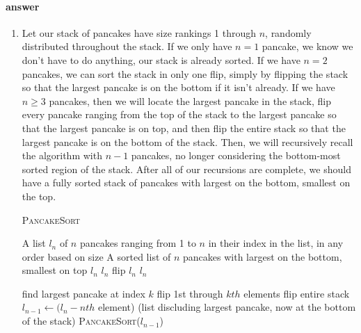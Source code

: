 \documentclass{article}
\begin{document}
\paragraph{answer}
\begin{enumerate}[a]
	\item
	Let our stack of pancakes have size rankings 1 through $n$, randomly distributed
	throughout the stack. If we only have $n=1$ pancake, we know we don't have to do
	anything, our stack is already sorted. If we have $n=2$ pancakes, we can sort the
	stack in only one flip, simply by flipping the stack so that the largest pancake is
	on the bottom if it isn't already. If we have $n \geq 3$ pancakes, then we will locate
	the largest pancake in the stack, flip every pancake ranging from the top of the stack to the
	largest pancake so that the largest pancake is on top, and then flip the entire stack so that the
	largest pancake is on the bottom of the stack. Then, we will recursively recall the algorithm
	with $n-1$ pancakes, no longer considering the bottom-most sorted region of the stack. After all
	of our recursions are complete, we should have a fully sorted stack of pancakes with largest on the
	bottom, smallest on the top.


	\begin{algorithm}
		\caption{\textsc{PancakeSort}}
		\begin{algorithmic}[1]
			\Require A list $l_n$ of $n$ pancakes ranging from 1 to $n$ in their index in the list, in any order based on size
			\Ensure A sorted list of $n$ pancakes with largest on the bottom, smallest on top
				\State \Return $l_n$
			\EndIf
					\State \Return $l_n$
				\Else
					\State flip $l_n$
					\State \Return $l_n$
				\EndIf

			\EndIf
				\State find largest pancake at index $k$
				\State flip 1st through $kth$ elements
				\State flip entire stack
				\State $l_{n-1} \gets (l_n - nth$ element) (list discluding largest pancake, now at the bottom of the stack)
				\State \textsc{PancakeSort}($l_{n-1}$)
			\EndIf
		\end{algorithmic}
	\end{algorithm}



\end{enumerate}
\end{document}

